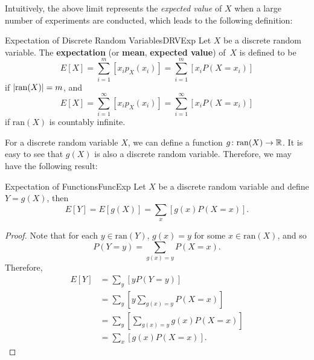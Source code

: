 \documentclass[math]{amznotes}
\theoremstyle{remark}
\begin{document}
Intuitively, the above limit represents the \textit{expected value} of $X$ when a large number of experiments are conducted, which leads to the following definition:
\begin{dfnbox}{Expectation of Discrete Random Variables}{DRVExp}
    Let $X$ be a discrete random variable. The {\color{red} \textbf{expectation}} (or {\color{red} \textbf{mean}}, {\color{red} \textbf{expected value}}) of~$X$ is defined to be
    \begin{equation*}
        E[X] = \sum_{i = 1}^{m}\left[x_ip_X(x_i)\right] = \sum_{i = 1}^{m}\left[x_iP(X = x_i)\right]
    \end{equation*}
    if ${\left\lvert {\mathrm{ran}(X)} \right\rvert} = m$, and
    \begin{equation*}
        E[X] = \sum_{i = 1}^{\infty}\left[x_ip_X(x_i)\right] = \sum_{i = 1}^{\infty}\left[x_iP(X = x_i)\right]
    \end{equation*}
    if $\mathrm{ran}(X)$ is countably infinite.
\end{dfnbox}
For a discrete random variable $X$, we can define a function $g \colon \mathrm{ran}(X) \to \mathbb{R}$. It is easy to see that $g(X)$ is also a discrete random variable. Therefore, we may have the following result:
\begin{thmbox}{Expectation of Functions}{FuncExp}
    Let $X$ be a discrete random variable and define $Y = g(X)$, then
    \begin{equation*}
        E[Y] = E[g(X)] = \sum_{x}\left[g(x)P(X = x)\right].
    \end{equation*}
    \tcblower
    \begin{proof}
        Note that for each $y \in \mathrm{ran}(Y)$, $g(x) = y$ for some $x \in \mathrm{ran}(X)$, and so
        \begin{equation*}
            P(Y = y) = \sum_{g(x) = y}P(X = x).
        \end{equation*}
        Therefore,
        \begin{align*}
            E[Y] & = \sum_{y}\left[yP(Y = y)\right] \\
            & = \sum_{y}\left[y\!\sum_{g(x) = y}\!P(X = x)\right] \\
            & = \sum_{y}\left[\sum_{g(x) = y}\!g(x)P(X = x)\right] \\
            & = \sum_{x}\left[g(x)P(X = x)\right].
        \end{align*}
    \end{proof}
\end{thmbox}
\end{document}
